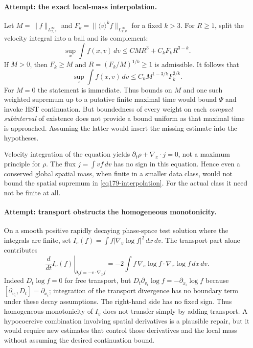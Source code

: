 \documentclass[11pt,a4paper]{article}
\numberwithin{equation}{section}
\begin{document}
\paragraph{Attempt: the exact local-mass interpolation.}
Let $M=\|f\|_{L^\infty_{x,v}}$ and
$F_k=\|\langle v\rangle^k f\|_{L^\infty_{x,v}}$ for a fixed $k>3$.
For $R\ge1$, split the velocity integral into a ball and its complement:
\[
 \sup_x\int f(x,v)\,dv\le CMR^3+C_kF_kR^{3-k}.
\]
If $M>0$, then $F_k\ge M$ and $R=(F_k/M)^{1/k}\ge1$ is admissible.
It follows that
\begin{equation}\label{eq179-interpolation}
 \sup_x\int f(x,v)\,dv
       \le C_k M^{1-3/k}F_k^{3/k}.
\end{equation}
For $M=0$ the statement is immediate. Thus bounds on $M$ and one such
weighted supremum up to a putative finite maximal time would bound $\Psi$
and invoke HST continuation. But boundedness of every weight on each
\emph{compact subinterval} of existence does not provide a bound uniform
as that maximal time is approached. Assuming the latter would insert the
missing estimate into the hypotheses.

Velocity integration of the equation yields
$\partial_t\rho+\nabla_x\cdot j=0$, not a maximum principle for $\rho$.
The flux $j=\int vf\,dv$ has no sign in this equation. Hence even a
conserved global spatial mass, when finite in a smaller data class, would
not bound the spatial supremum in \eqref{eq179-interpolation}. For the
actual class it need not be finite at all.

\paragraph{Attempt: transport obstructs the homogeneous monotonicity.}
On a smooth positive rapidly decaying phase-space test solution where the
integrals are finite, set
$I_v(f)=\int f|\nabla_v\log f|^2\,dx\,dv$.
The transport part alone contributes
\begin{equation}\label{eq179-cross}
 \left.\frac{d}{dt}I_v(f)\right|_{\partial_t f=-v\cdot\nabla_xf}
       =-2\int f\,\nabla_v\log f\cdot\nabla_x\log f\,dx\,dv.
\end{equation}
Indeed $D_t\log f=0$ for free transport, but
$D_t\partial_{v_i}\log f=-\partial_{x_i}\log f$ because
$[\partial_{v_i},D_t]=\partial_{x_i}$; integration of the transport
divergence has no boundary term under these decay assumptions.
The right-hand side has no fixed sign. Thus homogeneous monotonicity of
$I_v$ does not transfer simply by adding transport. A hypocoercive
combination involving spatial derivatives is a plausible repair, but it
would require new estimates that control those derivatives and the local
mass without assuming the desired continuation bound.
\end{document}
